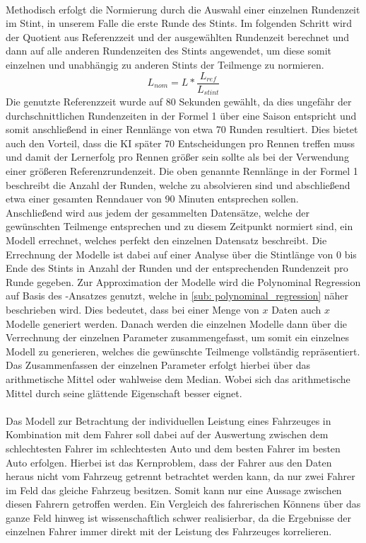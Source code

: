 \\
Methodisch erfolgt die Normierung durch die Auswahl einer einzelnen Rundenzeit im Stint, in unserem Falle die erste Runde des Stints. Im folgenden Schritt wird der Quotient aus Referenzzeit und der ausgewählten Rundenzeit berechnet und dann auf alle anderen Rundenzeiten des Stints angewendet, um diese somit einzelnen und unabhängig zu anderen Stints der Teilmenge zu normieren. 
\begin{equation}
    L_{nom} = L * \frac{L_{ref}}{L_{stint}}
\end{equation}
Die genutzte Referenzzeit wurde auf 80 Sekunden gewählt, da dies ungefähr der durchschnittlichen Rundenzeiten in der Formel 1 über eine Saison entspricht und somit anschließend in einer Rennlänge von etwa 70 Runden resultiert. Dies bietet auch den Vorteil, dass die KI später 70 Entscheidungen pro Rennen treffen muss und damit der Lernerfolg pro Rennen größer sein sollte als bei der Verwendung einer größeren Referenzrundenzeit. Die oben genannte Rennlänge in der Formel 1 beschreibt die Anzahl der Runden, welche zu absolvieren sind und abschließend etwa einer gesamten Renndauer von 90 Minuten entsprechen sollen.
\\
Anschließend wird aus jedem der gesammelten Datensätze, welche der gewünschten Teilmenge entsprechen und zu diesem Zeitpunkt normiert sind, ein Modell errechnet, welches perfekt den einzelnen Datensatz beschreibt. Die Errechnung der Modelle ist dabei auf einer Analyse über die Stintlänge von 0 bis Ende des Stints in Anzahl der Runden und der entsprechenden Rundenzeit pro Runde gegeben. Zur Approximation der Modelle wird die Polynominal Regression auf Basis des -Ansatzes genutzt, welche in \ref{sub: polynominal_regression} näher beschrieben wird. Dies bedeutet, dass bei einer Menge von $x$ Daten auch $x$ Modelle generiert werden. Danach werden die einzelnen Modelle dann über die Verrechnung der einzelnen Parameter zusammengefasst, um somit ein einzelnes Modell zu generieren, welches die gewünschte Teilmenge vollständig repräsentiert. Das Zusammenfassen der einzelnen Parameter erfolgt hierbei über das arithmetische Mittel oder wahlweise dem Median. Wobei sich das arithmetische Mittel durch seine glättende Eigenschaft besser eignet.
\\\\
Das Modell zur Betrachtung der individuellen Leistung eines Fahrzeuges in Kombination mit dem Fahrer soll dabei auf der Auswertung zwischen dem schlechtesten Fahrer im schlechtesten Auto und dem besten Fahrer im besten Auto erfolgen. Hierbei ist das Kernproblem, dass der Fahrer aus den Daten heraus nicht vom Fahrzeug getrennt betrachtet werden kann, da nur zwei Fahrer im Feld das gleiche Fahrzeug besitzen. Somit kann nur eine Aussage zwischen diesen Fahrern getroffen werden. Ein Vergleich des fahrerischen Könnens über das ganze Feld hinweg ist wissenschaftlich schwer realisierbar, da die Ergebnisse der einzelnen Fahrer immer direkt mit der Leistung des Fahrzeuges korrelieren.\\

